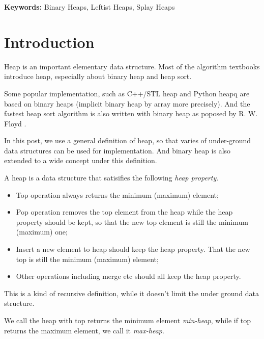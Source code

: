 \documentclass{article}
\begin{document}
\vspace{3cm}
{\bfseries Keywords:} Binary Heaps, Leftist Heaps, Splay Heaps


\maketitle

\section{Introduction}
\label{introduction}

Heap is an important elementary data structure. Most of the algorithm
textbooks introduce heap, especially about binary heap and heap sort.

Some popular implementation, such as C++/STL heap and Python heapq
are based on binary heaps (implicit binary heap by array
more precisely). And the fastest heap sort algorithm is also
written with binary heap as poposed by R. W. Floyd
\cite{wiki-heapsort} \cite{rosetta-heapsort}.

In this post, we use a general definition of heap, so that
varies of under-ground data structures can be used for implementation.
And binary heap is also extended to a wide concept under this definition.

A heap is a data structure that satisifies the following {\em heap property}.
\begin{itemize}
\item Top operation always returns the minimum (maximum) element;
\item Pop operation removes the top element from the heap while the heap
property should be kept, so that the new top element is still the 
minimum (maximum) one;
\item Insert a new element to heap should keep the heap property. That
the new top is still the minimum (maximum) element;
\item Other operations including merge etc should all keep the heap property.
\end{itemize}

This is a kind of recursive definition, while it doesn't limit the under
ground data structure.

We call the heap with top returns the minimum element {\em min-heap},
while if top returns the maximum element, we call it {\em max-heap}.
\end{document}
